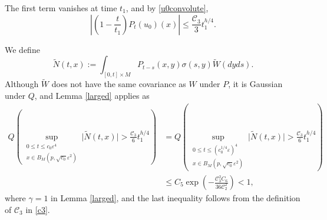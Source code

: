 \documentclass[12pt]{amsart}
\numberwithin{equation}{section}
\newcommand{\1}{\mathbf{1}}
\begin{document}
The first term vanishes at time $t_1$, and by \eqref{u0convolute},
\begin{equation}
\label{initialbound}
\left|\left(1-\frac{t}{t_1}\right)P_t(u_0)(x)\right|\leq \frac{\mathcal{C}_3}{3}t_1^{h/4}.
\end{equation}

We define
\[\widetilde{N}(t,x):=\int_{[0,t]\times M}P_{t-s}(x,y)\sigma(s,y)\widetilde{W}(dyds).\]
Although $\widetilde{W}$ does not have the same covariance as $W$ under $P$, it is Gaussian under $Q$, and Lemma \ref{larged} applies as
\begin{equation}
    \begin{split}
    \label{Q_bound}
        Q\left(\sup_{\substack{0\leq t\leq c_0\varepsilon^4\\ x\in B_M(p,\sqrt{c_0}\varepsilon^2)}}\vert \widetilde{N}(t,x)\vert>\frac{\mathcal{C}_3}{6}t_1^{h/4}\right)&=Q\left(\sup_{\substack{0\leq t\leq \left(c_0^{1/4}\varepsilon\right)^4\\ x\in B_M(p,\sqrt{c_0}\varepsilon^2)}}\vert \widetilde{N}(t,x)\vert>\frac{\mathcal{C}_3}{6}t_1^{h/4}\right)\\
&\leq C_5\exp\left(-\frac{\mathcal{C}_3^2C_6}{36\mathcal{C}_2^2}\right)<1,
    \end{split}
\end{equation}
where $\gamma=1$ in Lemma \ref{larged}, and the last inequality follows from the definition of $\mathcal C_3$ in \eqref{c3}.
\end{document}
